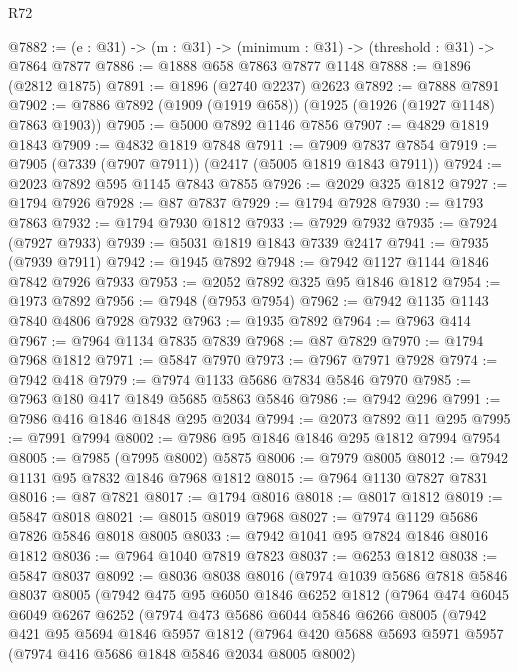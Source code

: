 \begin{lexlean}{R72}
\begin{coremodule}
@7882 := (e : @31) -> (m : @31) -> (minimum : @31) -> (threshold : @31) -> @7864 @7877
@7886 := @1888 @658 @7863 @7877 @1148
@7888 := @1896 (@2812 @1875)
@7891 := @1896 (@2740 @2237) @2623
@7892 := @7888 @7891
@7902 := @7886 @7892 (@1909 (@1919 @658)) (@1925 (@1926 (@1927 @1148) @7863 @1903))
@7905 := @5000 @7892 @1146 @7856
@7907 := @4829 @1819 @1843
@7909 := @4832 @1819 @7848
@7911 := @7909 @7837 @7854
@7919 := @7905 (@7339 (@7907 @7911)) (@2417 (@5005 @1819 @1843 @7911))
@7924 := @2023 @7892 @595 @1145 @7843 @7855
@7926 := @2029 @325 @1812
@7927 := @1794 @7926
@7928 := @87 @7837
@7929 := @1794 @7928
@7930 := @1793 @7863
@7932 := @1794 @7930 @1812
@7933 := @7929 @7932
@7935 := @7924 (@7927 @7933)
@7939 := @5031 @1819 @1843 @7339 @2417
@7941 := @7935 (@7939 @7911)
@7942 := @1945 @7892
@7948 := @7942 @1127 @1144 @1846 @7842 @7926 @7933
@7953 := @2052 @7892 @325 @95 @1846 @1812
@7954 := @1973 @7892
@7956 := @7948 (@7953 @7954)
@7962 := @7942 @1135 @1143 @7840 @4806 @7928 @7932
@7963 := @1935 @7892
@7964 := @7963 @414
@7967 := @7964 @1134 @7835 @7839
@7968 := @87 @7829
@7970 := @1794 @7968 @1812
@7971 := @5847 @7970
@7973 := @7967 @7971 @7928
@7974 := @7942 @418
@7979 := @7974 @1133 @5686 @7834 @5846 @7970
@7985 := @7963 @180 @417 @1849 @5685 @5863 @5846
@7986 := @7942 @296
@7991 := @7986 @416 @1846 @1848 @295 @2034
@7994 := @2073 @7892 @11 @295
@7995 := @7991 @7994
@8002 := @7986 @95 @1846 @1846 @295 @1812 @7994 @7954
@8005 := @7985 (@7995 @8002) @5875
@8006 := @7979 @8005
@8012 := @7942 @1131 @95 @7832 @1846 @7968 @1812
@8015 := @7964 @1130 @7827 @7831
@8016 := @87 @7821
@8017 := @1794 @8016
@8018 := @8017 @1812
@8019 := @5847 @8018
@8021 := @8015 @8019 @7968
@8027 := @7974 @1129 @5686 @7826 @5846 @8018 @8005
@8033 := @7942 @1041 @95 @7824 @1846 @8016 @1812
@8036 := @7964 @1040 @7819 @7823
@8037 := @6253 @1812
@8038 := @5847 @8037
@8092 := @8036
    @8038
    @8016
    (@7974
      @1039
      @5686
      @7818
      @5846
      @8037
      @8005
      (@7942
        @475
        @95
        @6050
        @1846
        @6252
        @1812
        (@7964
          @474
          @6045
          @6049
          @6267
          @6252
          (@7974
            @473
            @5686
            @6044
            @5846
            @6266
            @8005
            (@7942
              @421
              @95
              @5694
              @1846
              @5957
              @1812
              (@7964
                @420
                @5688
                @5693
                @5971
                @5957
                (@7974 @416 @5686 @1848 @5846 @2034 @8005 @8002)

\end{coremodule}
\end{lexlean}

